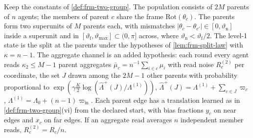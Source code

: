 \begin{definition}\label{def:rfm-nested}
Keep the constants of \cref{def:frm-two-group}. The population consists of $2M$ parents of $n$ agents; the members of parent $c$ share the frame $\mathrm{Rot}(\theta_c)$. The parents form two superunits of $M$ parents each, with mismatches $|\theta_c-\theta_{c'}|\in[0,\vartheta_{\mathrm n}]$ inside a superunit and in $[\vartheta_{\mathrm f},\vartheta_{\max}]\subset(0,\pi]$ across, where $\vartheta_{\mathrm n}<\vartheta_{\mathrm f}/2$. The level-1 state is the split at the parents under the hypotheses of \cref{lem:frm-split-law} with $\kappa=n-1$. The aggregate channel is an added hypothesis: each round every agent reads $\kappa_2\le M-1$ parent aggregates $\bar\mu_c=n^{-1}\sum_{i\in c}\mu_i$ with read noise $R_c^{(2)}$ per coordinate, the set $J$ drawn among the $2M-1$ other parents with probability proportional to $\exp(\gamma\frac K2\log(\hat\Lambda^+(J)/\Lambda^{(1)}))$, $\hat\Lambda^+(J)=\Lambda^{(1)}+\sum_{c\in J}\varpi_c$, $\Lambda^{(1)}=\Lambda_0+(n-1)\varpi_{\mathrm{in}}$. Each parent edge has a translation learned as in \cref{def:frm-two-group}(vi) from the declared start, with bias fractions $y_c$ on near edges and $x_c$ on far edges. If an aggregate read averages $n$ independent member reads, $R_c^{(2)}=R_c/n$.
\end{definition}

